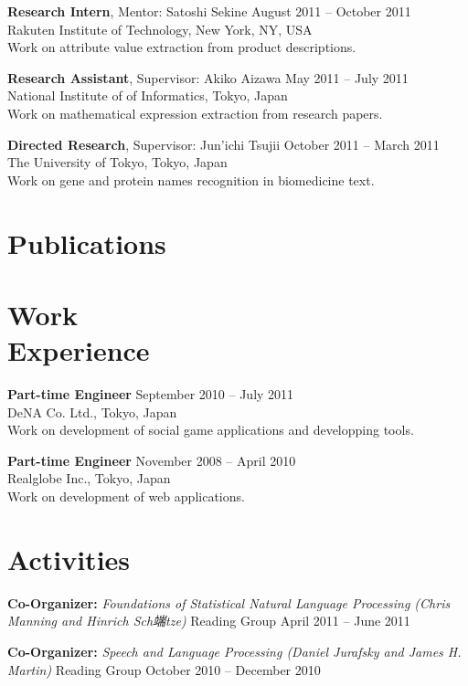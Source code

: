 \documentclass[margin]{res}
\begin{document}
\begin{resume}
\textbf{Research Intern}, Mentor: Satoshi Sekine \hfill August 2011 -- October 2011\\
Rakuten Institute of Technology, New York, NY, USA\\
Work on attribute value extraction from product descriptions. 

\textbf{Research Assistant}, Supervisor: Akiko Aizawa \hfill May 2011 -- July 2011\\
National Institute of of Informatics, Tokyo, Japan\\
Work on mathematical expression extraction from research papers.

\textbf{Directed Research}, Supervisor: Jun'ichi Tsujii \hfill October 2011 -- March 2011\\
The University of Tokyo, Tokyo, Japan\\
Work on gene and protein names recognition in biomedicine text.\\

\section{Publications}
\renewcommand\refname{}
\nocite{Usami2012, Usami2011-rrds, Usami2011-BioNLP, Usami2011-SIGNL, Usami2011}



\section{Work \\ Experience}
\textbf{Part-time Engineer} \hfill September 2010 -- July 2011\\
DeNA Co. Ltd., Tokyo, Japan\\
Work on development of social game applications and developping tools.

\textbf{Part-time Engineer} \hfill November 2008 -- April 2010\\
Realglobe Inc., Tokyo, Japan\\
Work on development of web applications.\\

\section{Activities}
\textbf{Co-Organizer:} {\sl Foundations of Statistical Natural Language Processing (Chris Manning and Hinrich Sch端tze)} Reading Group \hfill April 2011 -- June 2011

\textbf{Co-Organizer:} {\sl Speech and Language Processing (Daniel Jurafsky and James H. Martin)} Reading Group \hfill October 2010 -- December 2010\\


\end{resume}
\end{document}
